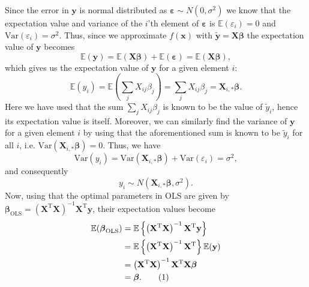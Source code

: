 \documentclass[aps,pra,english,notitlepage,reprint,nofootinbib]{revtex4-1}  %
\newcommand\numberthis{\addtocounter{equation}{1}\tag{\theequation}}
\begin{document}
Since the error in $\mathbf{y}$ is normal distributed as $\boldsymbol{\varepsilon}\sim N(0,\sigma^2)$ we know that the expectation value and variance of the $i$'th element of $\boldsymbol{\varepsilon}$ is $\mathbb{E}(\varepsilon_i)=0$ and $\textrm{Var}(\varepsilon_i)=\sigma^2$. Thus, since we approximate $f(\mathbf{x})$ with $\mathbf{\tilde{y}}=\mathbf{X}\boldsymbol{\beta}$ the expectation value of $\mathbf{y}$ becomes 
\begin{equation}
\mathbb{E}(\mathbf{y})=\mathbb{E}(\mathbf{X}\boldsymbol{\beta}) + \mathbb{E}(\boldsymbol{\varepsilon}) = \mathbb{E}(\mathbf{X}\boldsymbol{\beta}),
\end{equation}
which gives us the expectation value of $\mathbf{y}$ for a given element $i$:
\begin{equation}
\mathbb{E}(y_i) = \mathbb{E}\left(\sum_jX_{ij}\beta_j\right) = \sum_jX_{ij}\beta_j = \mathbf{X}_{i,*}\boldsymbol{\beta}.
\end{equation}
Here we have used that the sum $\sum_jX_{ij}\beta_j$ is known to be the value of $\tilde{y}_i$, hence its expectation value is itself. Moreover, we can similarly find the variance of $\mathbf{y}$ for a given element $i$ by using that the aforementioned sum is known to be $\tilde{y}_i$ for all $i$, i.e. $\textrm{Var}(\mathbf{X}_{i,*}\boldsymbol{\beta})=0$. Thus, we have
\begin{equation}
\textrm{Var}(y_i) = \textrm{Var}(\mathbf{X}_{i,*}\boldsymbol{\beta}) + \textrm{Var}(\varepsilon_i) = \sigma^2,
\end{equation}
and consequently
\begin{equation}
  y_i\sim N(\mathbf{X}_{i,*}\boldsymbol{\beta},\sigma^2).
\end{equation}
Now, using that the optimal parameters in OLS are given by $\boldsymbol{\beta}_\textrm{OLS}=\left(\mathbf{X}^\textrm{T}\mathbf{X}\right)^{-1}\mathbf{X}^\textrm{T}\mathbf{y}$, their expectation values become
\begin{align*}
  \mathbb{E}(\boldsymbol{\beta}_\textrm{OLS})&=\mathbb{E}\left\{ \left(\mathbf{X}^\textrm{T}\mathbf{X}\right)^{-1}\mathbf{X}^\textrm{T}\mathbf{y} \right\} \\
  &= \mathbb{E}\left\{\left(\mathbf{X}^\textrm{T}\mathbf{X}\right)^{-1}\mathbf{X}^\textrm{T}\right\} \mathbb{E}(\mathbf{y}) \\
  &= \left(\mathbf{X}^\textrm{T}\mathbf{X}\right)^{-1}\mathbf{X}^\textrm{T}\mathbf{X}\boldsymbol{\beta} \\
  &= \boldsymbol{\beta}. \numberthis \label{appeq:expect beta OLS}
\end{align*}
\end{document}
